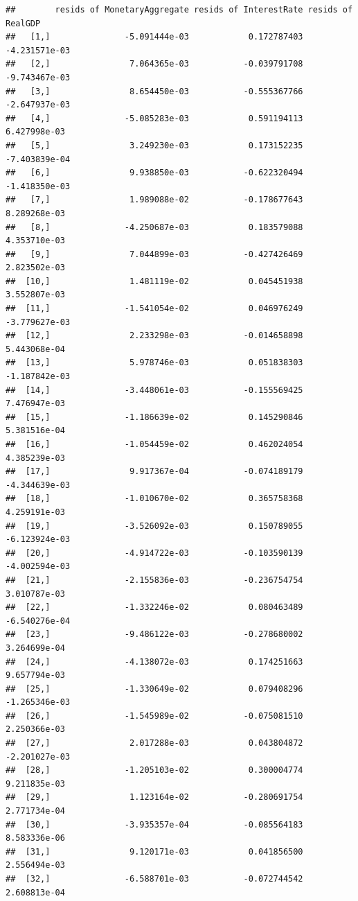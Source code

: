 \documentclass[11pt,preprint, authoryear]{elsarticle}
\numberwithin{equation}{section}
\numberwithin{figure}{section}
\numberwithin{table}{section}
\begin{document}
\begin{verbatim}
##        resids of MonetaryAggregate resids of InterestRate resids of RealGDP
##   [1,]               -5.091444e-03            0.172787403     -4.231571e-03
##   [2,]                7.064365e-03           -0.039791708     -9.743467e-03
##   [3,]                8.654450e-03           -0.555367766     -2.647937e-03
##   [4,]               -5.085283e-03            0.591194113      6.427998e-03
##   [5,]                3.249230e-03            0.173152235     -7.403839e-04
##   [6,]                9.938850e-03           -0.622320494     -1.418350e-03
##   [7,]                1.989088e-02           -0.178677643      8.289268e-03
##   [8,]               -4.250687e-03            0.183579088      4.353710e-03
##   [9,]                7.044899e-03           -0.427426469      2.823502e-03
##  [10,]                1.481119e-02            0.045451938      3.552807e-03
##  [11,]               -1.541054e-02            0.046976249     -3.779627e-03
##  [12,]                2.233298e-03           -0.014658898      5.443068e-04
##  [13,]                5.978746e-03            0.051838303     -1.187842e-03
##  [14,]               -3.448061e-03           -0.155569425      7.476947e-03
##  [15,]               -1.186639e-02            0.145290846      5.381516e-04
##  [16,]               -1.054459e-02            0.462024054      4.385239e-03
##  [17,]                9.917367e-04           -0.074189179     -4.344639e-03
##  [18,]               -1.010670e-02            0.365758368      4.259191e-03
##  [19,]               -3.526092e-03            0.150789055     -6.123924e-03
##  [20,]               -4.914722e-03           -0.103590139     -4.002594e-03
##  [21,]               -2.155836e-03           -0.236754754      3.010787e-03
##  [22,]               -1.332246e-02            0.080463489     -6.540276e-04
##  [23,]               -9.486122e-03           -0.278680002      3.264699e-04
##  [24,]               -4.138072e-03            0.174251663      9.657794e-03
##  [25,]               -1.330649e-02            0.079408296     -1.265346e-03
##  [26,]               -1.545989e-02           -0.075081510      2.250366e-03
##  [27,]                2.017288e-03            0.043804872     -2.201027e-03
##  [28,]               -1.205103e-02            0.300004774      9.211835e-03
##  [29,]                1.123164e-02           -0.280691754      2.771734e-04
##  [30,]               -3.935357e-04           -0.085564183      8.583336e-06
##  [31,]                9.120171e-03            0.041856500      2.556494e-03
##  [32,]               -6.588701e-03           -0.072744542      2.608813e-04

\end{verbatim}
\end{document}
